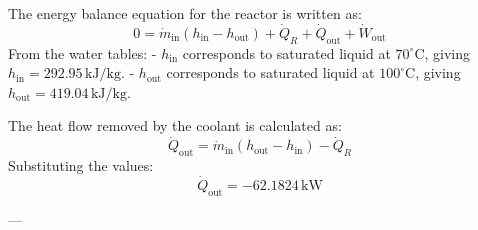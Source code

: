 The energy balance equation for the reactor is written as:  
\[
0 = \dot{m}_{\text{in}} (h_{\text{in}} - h_{\text{out}}) + \dot{Q}_R + \dot{Q}_{\text{out}} + \dot{W}_{\text{out}}
\]  
From the water tables:  
- \( h_{\text{in}} \) corresponds to saturated liquid at \( 70^\circ\text{C} \), giving \( h_{\text{in}} = 292.95 \, \text{kJ/kg} \).  
- \( h_{\text{out}} \) corresponds to saturated liquid at \( 100^\circ\text{C} \), giving \( h_{\text{out}} = 419.04 \, \text{kJ/kg} \).  

The heat flow removed by the coolant is calculated as:  
\[
\dot{Q}_{\text{out}} = \dot{m}_{\text{in}} (h_{\text{out}} - h_{\text{in}}) - \dot{Q}_R
\]  
Substituting the values:  
\[
\dot{Q}_{\text{out}} = -62.1824 \, \text{kW}
\]  

---